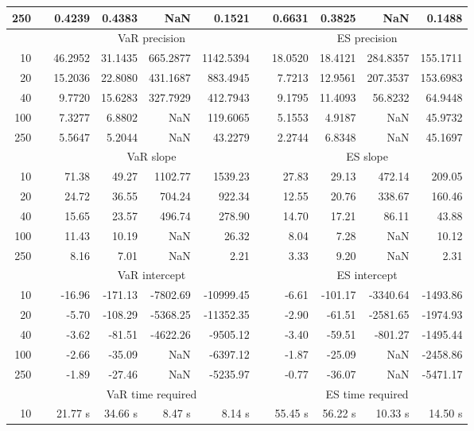 {\begin{table}[h]
\begin{tabular}{rr rrrr r rrrr}
250 && 0.4239  & 0.4383  &    NaN & 0.1521 && 0.6631  & 0.3825  &    NaN & 0.1488 \\ 
\hline 
 & & \multicolumn{4}{c}{VaR precision} &&  \multicolumn{4}{c}{ES precision} \\ \cline{3-6}  \cline{8-11}
10 && 46.2952 & 31.1435 & 665.2877 & 1142.5394 & & 18.0520 & 18.4121 & 284.8357 & 155.1711 \\ 
20 && 15.2036 & 22.8080 & 431.1687 & 883.4945 & & 7.7213 & 12.9561 & 207.3537 & 153.6983 \\ 
40 && 9.7720 & 15.6283 & 327.7929 & 412.7943 & & 9.1795 & 11.4093 & 56.8232 & 64.9448 \\ 
100 && 7.3277 & 6.8802 &    NaN & 119.6065 & & 5.1553 & 4.9187 &    NaN & 45.9732 \\ 
250 && 5.5647 & 5.2044 &    NaN & 43.2279 & & 2.2744 & 6.8348 &    NaN & 45.1697 \\ 
\hline 
 & & \multicolumn{4}{c}{ VaR slope} && \multicolumn{4}{c}{ES slope} \\ \cline{3-6}  \cline{8-11}
10 && 71.38 & 49.27 & 1102.77 & 1539.23 && 27.83 & 29.13 & 472.14 & 209.05 \\ 
20 && 24.72 & 36.55 & 704.24 & 922.34 && 12.55 & 20.76 & 338.67 & 160.46 \\ 
40 && 15.65 & 23.57 & 496.74 & 278.90 && 14.70 & 17.21 & 86.11 & 43.88 \\ 
100 && 11.43 & 10.19 &  NaN & 26.32 && 8.04 & 7.28 &  NaN & 10.12 \\ 
250 && 8.16 & 7.01 &  NaN & 2.21 && 3.33 & 9.20 &  NaN & 2.31 \\ 
\hline 
 & & \multicolumn{4}{c}{ VaR intercept} &&  \multicolumn{4}{c}{ES intercept} \\ \cline{3-6}  \cline{8-11}
10 && -16.96 & -171.13 & -7802.69 & -10999.45 && -6.61 & -101.17 & -3340.64 & -1493.86 \\ 
20 && -5.70 & -108.29 & -5368.25 & -11352.35 && -2.90 & -61.51 & -2581.65 & -1974.93 \\ 
40 && -3.62 & -81.51 & -4622.26 & -9505.12 && -3.40 & -59.51 & -801.27 & -1495.44 \\ 
100 && -2.66 & -35.09 &  NaN & -6397.12 && -1.87 & -25.09 &  NaN & -2458.86 \\ 
250 && -1.89 & -27.46 &  NaN & -5235.97 && -0.77 & -36.07 &  NaN & -5471.17 \\ 
\hline 
 & & \multicolumn{4}{c}{VaR time required} && \multicolumn{4}{c}{ES time required} \\ \cline{3-6}  \cline{8-11}
10 & & 21.77 s & 34.66 s & 8.47 s & 8.14 s && 55.45 s & 56.22 s & 10.33 s & 14.50 s \\ 

\end{tabular}
\end{table}}
